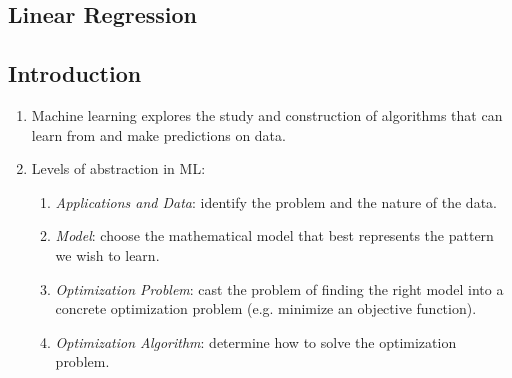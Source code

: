 \documentclass[10pt]{article}
\begin{document}
\begin{multicols}{2}
\section{Linear Regression}
\vspace{-0.2cm}
\begin{addmargin}[0.8em]{0.5em}
    \subsection{Introduction}
    \vspace{-0.2cm}
    \begin{enumerate}[label=(\alph*)]
        \item Machine learning explores the study and construction of algorithms that can learn from and make predictions on data.
        \item Levels of abstraction in ML:
        \begin{enumerate}
            \item \textit{Applications and Data}: identify the problem and the nature of the data.
            \item \textit{Model}: choose the mathematical model that best represents the pattern we wish to learn.
            \item \textit{Optimization Problem}: cast the problem of finding the right model into a concrete optimization problem (e.g. minimize an objective function).
            \item \textit{Optimization Algorithm}: determine how to solve the optimization problem.
        \end{enumerate}
    \end{enumerate}  
    \vspace{-0.2cm}

\end{addmargin}
\end{multicols}
\end{document}
